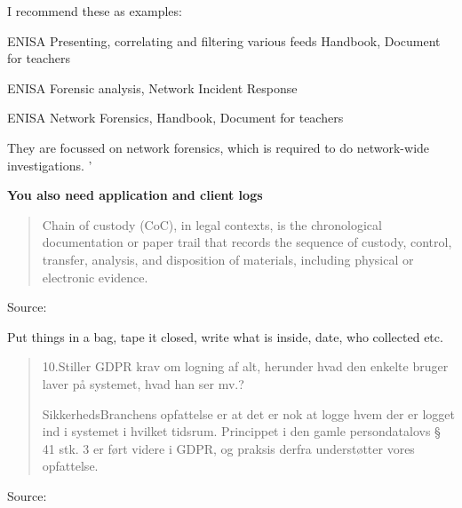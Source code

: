 \documentclass[Screen16to9,17pt]{foils}
\begin{document}

\begin{list2}
\item I recommend these as examples:
\item ENISA Presenting, correlating and filtering various feeds Handbook, Document for teachers\\ 
\item ENISA Forensic analysis, Network Incident Response\\ 
\item ENISA Network Forensics, Handbook, Document for teachers\\ 
\end{list2}

They are focussed on network forensics, which is required to do network-wide investigations. '

{\bf You also need application and client logs}




\begin{quote}
Chain of custody (CoC), in legal contexts, is the chronological documentation or paper trail that records the sequence of custody, control, transfer, analysis, and disposition of materials, including physical or electronic evidence.
\end{quote}
Source: 

\begin{list2}
\item Put things in a bag, tape it closed, write what is inside, date, who collected etc.
\end{list2}




\begin{quote}
  10.Stiller GDPR krav om logning af alt, herunder hvad den enkelte bruger laver på
  systemet, hvad han ser mv.?

  SikkerhedsBranchens opfattelse er at det er nok at logge hvem der er logget ind i
  systemet i hvilket tidsrum. Princippet i den gamle persondatalovs § 41 stk. 3 er
  ført videre i GDPR, og praksis derfra understøtter vores opfattelse.
\end{quote}
Source: \\{\footnotesize
{}}
\end{document}
